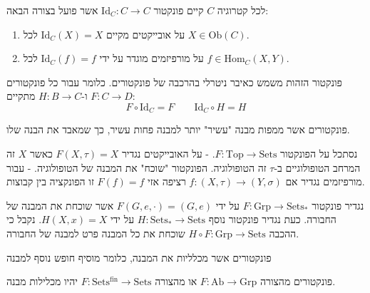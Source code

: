 \documentclass{tstextbook}
\begin{document}
\begin{definition}
לכל קטרוגיה \(C\) קיים פונקטור \(\mathrm{Id}_{C}:C\to C\) אשר פועל בצורה הבאה:

  \begin{enumerate}
    \item על אובייקטים מקיים \(\mathrm{Id}_{C}(X)=X\) לכל \(X \in \mathrm{Ob}(C)\). 


    \item על מורפיזמים מוגדר על ידי \(\mathrm{Id}_{C}(f)=f\) לכל \(f \in \mathrm{Hom}_{C}(X,Y)\). 


  \end{enumerate}
\end{definition}
\begin{remark}
פונקטור הזהות משמש כאיבר ניטרלי בהרכבה של פונקטורים. כלומר עבור כל פונקטורים \(F:C\to D\) ו-\(H:B\to C\) מתקיים:
$$F\circ{\mathrm{Id}}_{C}=F\qquad{\mathrm{Id}}_{C}\circ H=H$$

\end{remark}
\begin{definition}
פונקטורים אשר ממפות מבנה "עשיר" יותר למבנה פחות עשיר, כך שמאבד את הבנה שלו.

\end{definition}
\begin{example}
נסתכל על הפונקטור \(F:\text{Top}\to\text{Sets}\).
- על האובייקטים נגדיר \(F(X,\tau)=X\) כאשר \(X\) זה המרחב הטופולוגיים ב-\(\tau\) זה הטופולוגיה. הפונקטור "שוכח" את המבנה של הטופולוגיה.
- עבור מורפיזמים נגדיר אם \(f:(X,\tau)\to (Y,\sigma)\) רציפה אזי \(F(f)=f\) זו הפונקציה בין קבוצות.

\end{example}
\begin{example}
נגדיר פונקטור \(F:\text{Grp}\to\text{Sets}_{*}\) על ידי \(F(G,e,\cdot)=(G,e)\) אשר שוכחת את המבנה של החבורה. 
כעת נגדיר פונקטור נוסף \(H:\text{Sets}_{*}\to\text{Sets}\) על ידי \(H(X,x)=X\). נקבל כי ההכבה \(H\circ F:\text{Grp}\to\text{Sets}\) שוכחת את כל המבנה פרט למבנה של החבורה.

\end{example}
\begin{definition}
פונקטורים אשר מכלליות את המבנה, כלומר מוסיף חופש נוסף למבנה

\end{definition}
\begin{example}
פונקטורים מהצורה \(F:\mathrm{Ab}\to \mathrm{Grp}\) או מהצורה \(F:\mathrm{Sets ^{fin}}\to \mathrm{Sets}\) יהיו מכלילות מבנה.

\end{example}
\end{document}
